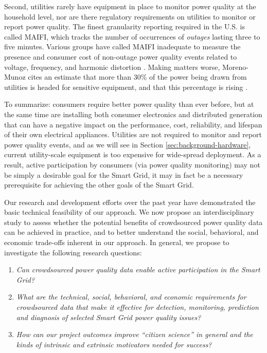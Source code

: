 \documentclass[11pt]{article}
\begin{document}
Second, utilities rarely have equipment in place to monitor power quality at the household level, nor are there regulatory requirements on utilities to monitor or report power quality. The finest granularity reporting required in the U.S. is called MAIFI, which tracks the number of occurrences of {\em outages} lasting three to five minutes. Various groups have called MAIFI inadequate to measure the presence and consumer cost of non-outage power quality events related to voltage, frequency, and harmonic distortion \cite{Rouse2011,LaCommare2004,Eto2008}. Making matters worse, Moreno-Munoz cites an estimate that more than 30\% of the power being drawn from utilities is headed for sensitive equipment, and that this percentage is rising \cite{Moreno-Munoz2007}. 

To summarize: consumers require better power quality than ever before, but at the same time are installing both consumer electronics and distributed generation that can have a negative impact on the performance, cost, reliability, and lifespan of their own electrical appliances. Utilities are not required to monitor and report power quality events, and as we will see in Section \ref{sec:background-hardware}, current utility-scale equipment is too expensive for wide-spread deployment. As a result, active participation by consumers (via power quality monitoring) may not be simply a desirable goal for the Smart Grid, it may in fact be a necessary prerequisite for achieving the other goals of the Smart Grid. 

Our research and development efforts over the past year have demonstrated the basic technical feasibility of our approach.   We now propose an interdisciplinary study to assess whether the potential benefits of crowdsourced power quality data can be achieved in practice, and to better understand the social, behavioral, and economic trade-offs inherent in our approach.  In general, we propose to investigate the following research questions:

\begin{enumerate}

\item {\em Can crowdsourced power quality data enable active participation in the Smart Grid?}

\item {\em What are the technical, social, behavioral, and economic requirements for crowdsourced data that make it effective for detection, monitoring, prediction and diagnosis of selected Smart Grid power quality issues?}

\item {\em How can our project outcomes improve ``citizen science'' in general and the kinds of intrinsic and extrinsic motivators needed for success?}

\end{enumerate}
\end{document}
